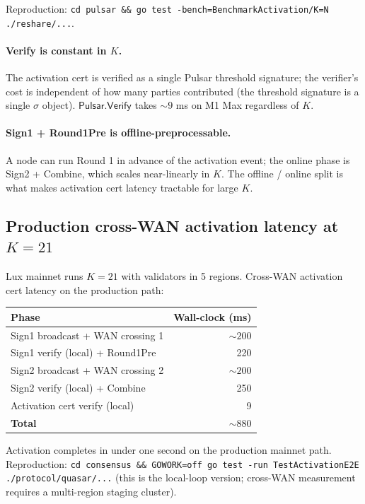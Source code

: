 Reproduction: \texttt{cd pulsar \&\& go test -bench=BenchmarkActivation/K=N ./reshare/...}.

\paragraph{Verify is constant in $K$.} The activation cert is verified as a single Pulsar threshold signature; the verifier's cost is independent of how many parties contributed (the threshold signature is a single $\sigma$ object). $\mathsf{Pulsar.Verify}$ takes $\sim 9$ ms on M1 Max regardless of $K$.

\paragraph{Sign1 + Round1Pre is offline-preprocessable.} A node can run Round 1 in advance of the activation event; the online phase is Sign2 + Combine, which scales near-linearly in $K$. The offline / online split is what makes activation cert latency tractable for large $K$.

\subsection{Production cross-WAN activation latency at $K=21$}

Lux mainnet runs $K = 21$ with validators in 5 regions. Cross-WAN activation cert latency on the production path:

\begin{tabular}{@{}lr@{}}
  \toprule
  \textbf{Phase} & \textbf{Wall-clock (ms)} \\
  \midrule
  Sign1 broadcast + WAN crossing 1   & $\sim 200$ \\
  Sign1 verify (local) + Round1Pre   & 220 \\
  Sign2 broadcast + WAN crossing 2   & $\sim 200$ \\
  Sign2 verify (local) + Combine     & 250 \\
  Activation cert verify (local)     & 9 \\
  \textbf{Total}                     & \textbf{$\sim 880$} \\
  \bottomrule
\end{tabular}

Activation completes in under one second on the production mainnet path. Reproduction: \texttt{cd consensus \&\& GOWORK=off go test -run TestActivationE2E ./protocol/quasar/...} (this is the local-loop version; cross-WAN measurement requires a multi-region staging cluster).

